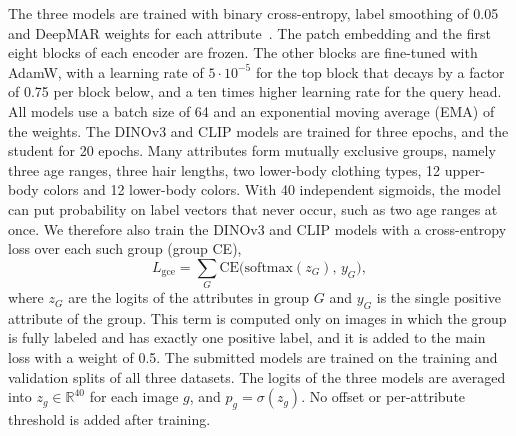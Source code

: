 \documentclass[10pt,twocolumn,letterpaper]{article}
\begin{document}
The three models are trained with binary cross-entropy, label smoothing of 0.05~\cite{szegedy} and DeepMAR weights for each attribute~\cite{deepmar}. The patch embedding and the first eight blocks of each encoder are frozen. The other blocks are fine-tuned with AdamW, with a learning rate of $5\cdot10^{-5}$ for the top block that decays by a factor of 0.75 per block below, and a ten times higher learning rate for the query head. All models use a batch size of 64 and an exponential moving average (EMA) of the weights. The DINOv3 and CLIP models are trained for three epochs, and the student for 20 epochs. Many attributes form mutually exclusive groups, namely three age ranges, three hair lengths, two lower-body clothing types, 12 upper-body colors and 12 lower-body colors. With 40 independent sigmoids, the model can put probability on label vectors that never occur, such as two age ranges at once. We therefore also train the DINOv3 and CLIP models with a cross-entropy loss over each such group (group CE),
\begin{equation}
L_{\mathrm{gce}}=\sum_{G}\mathrm{CE}\big(\mathrm{softmax}(z_G),\,y_G\big),
\label{eq:gce}
\end{equation}
where $z_G$ are the logits of the attributes in group $G$ and $y_G$ is the single positive attribute of the group. This term is computed only on images in which the group is fully labeled and has exactly one positive label, and it is added to the main loss with a weight of 0.5. The submitted models are trained on the training and validation splits of all three datasets. The logits of the three models are averaged into $z_g\in\mathbb{R}^{40}$ for each image $g$, and $p_g=\sigma(z_g)$. No offset or per-attribute threshold is added after training.
\end{document}
